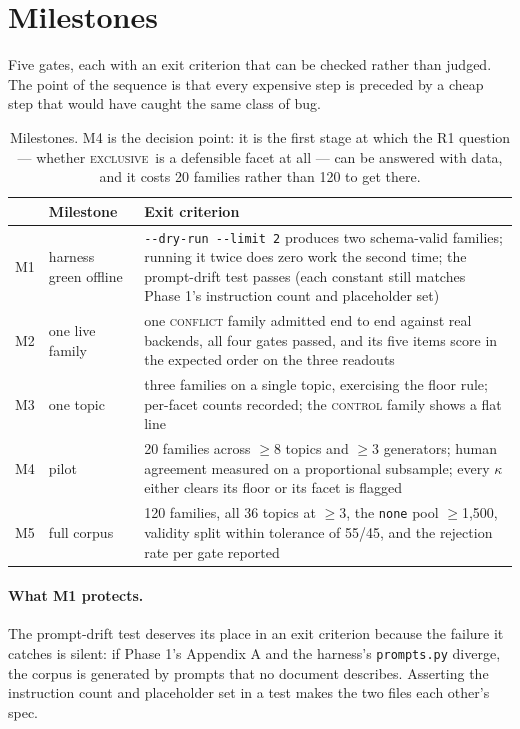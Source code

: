 \documentclass[11pt]{article}
\newcommand{\cExc}{\textsc{exclusive}}
\newcommand{\pymod}[1]{\texttt{#1}}
\begin{document}
\section{Milestones}
\label{sec:milestones}

Five gates, each with an exit criterion that can be checked rather than judged. The point of the
sequence is that every expensive step is preceded by a cheap step that would have caught the same
class of bug.

\begin{table}[h]\centering\small
\renewcommand{\arraystretch}{1.2}
\begin{tabular}{@{}llp{7.4cm}@{}}
\toprule
& \textbf{Milestone} & \textbf{Exit criterion}\\
\midrule
M1 & harness green offline &
  \texttt{-{}-dry-run -{}-limit 2} produces two schema-valid families; running it twice does zero
  work the second time; the prompt-drift test passes (each constant still matches Phase 1's
  instruction count and placeholder set)\\
M2 & one live family &
  one \textsc{conflict} family admitted end to end against real backends, all four gates passed,
  and its five items score in the expected order on the three readouts\\
M3 & one topic &
  three families on a single topic, exercising the floor rule; per-facet counts recorded; the
  \textsc{control} family shows a flat line\\
M4 & pilot &
  20 families across $\geq$8 topics and $\geq$3 generators; human agreement measured on a
  proportional subsample; every $\kappa$ either clears its floor or its facet is flagged\\
M5 & full corpus &
  120 families, all 36 topics at $\geq$3, the \texttt{none} pool $\geq$1{,}500, validity split
  within tolerance of 55/45, and the rejection rate per gate reported\\
\bottomrule
\end{tabular}
\caption{Milestones. M4 is the decision point: it is the first stage at which the R1 question ---
whether \cExc\ is a defensible facet at all --- can be answered with data, and it costs 20
families rather than 120 to get there.}
\label{tab:milestones}
\end{table}

\paragraph{What M1 protects.} The prompt-drift test deserves its place in an exit criterion
because the failure it catches is silent: if Phase 1's Appendix A and the harness's
\pymod{prompts.py} diverge, the corpus is generated by prompts that no document describes. Asserting
the instruction count and placeholder set in a test makes the two files each other's spec.
\end{document}
